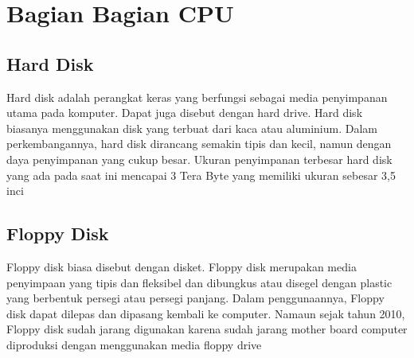 \section{Bagian Bagian CPU}
\subsection{Hard Disk}
	Hard disk adalah perangkat keras yang berfungsi sebagai media penyimpanan utama pada komputer. Dapat juga disebut dengan hard drive. Hard disk biasanya menggunakan disk yang  terbuat dari kaca atau aluminium. Dalam perkembangannya, hard disk dirancang semakin tipis dan kecil, namun dengan daya penyimpanan yang cukup besar. Ukuran penyimpanan terbesar hard disk yang ada pada saat ini mencapai 3 Tera Byte yang memiliki ukuran sebesar 3,5 inci
\subsection{Floppy Disk}
	Floppy disk biasa disebut dengan disket. Floppy disk merupakan media penyimpaan yang tipis dan fleksibel dan dibungkus atau disegel dengan plastic yang berbentuk persegi atau persegi panjang. Dalam penggunaannya, Floppy disk dapat dilepas dan dipasang kembali ke computer. Namaun sejak tahun 2010, Floppy disk sudah jarang digunakan karena sudah jarang mother board computer diproduksi dengan menggunakan media floppy drive